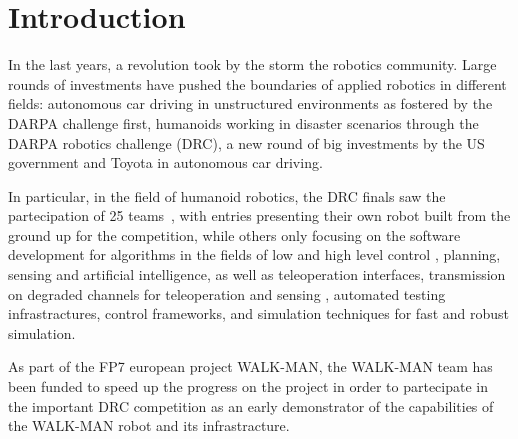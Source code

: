 \documentclass[%
	paper=A4,					%
	twoside=true,				%
	openright,			.
	parskip=full,				%
	chapterprefix=true,			%
	11pt,						%
	headings=normal,			%
	bibliography=totoc,			%
	listof=totoc,				%
	titlepage=on,				%
	captions=tableabove,		%
	draft=false,				%
]{scrreprt}%
\begin{document}

\pagestyle{empty}				%
\cleardoublepage

\pagestyle{plain}				%
\cleardoublepage
%
\setcounter{tocdepth}{2}		%
\tableofcontents				%
\cleardoublepage

\setcounter{page}{1}			%
\pagestyle{maincontentstyle} 	%

\chapter{Introduction}
In the last years, a revolution took by the storm the robotics community. Large rounds of investments have pushed the boundaries of applied robotics in different fields: autonomous car driving in unstructured environments as fostered by the DARPA challenge first, humanoids working in disaster scenarios through the DARPA robotics challenge (DRC), a new round of big investments by the US government and Toyota in autonomous car driving.

In particular, in the field of humanoid robotics,  the DRC finals saw the partecipation of 25 teams~\cite{DRC-what-happened}, with entries presenting their own robot built from the ground up for the competition, while others only focusing on the software development for algorithms in the fields of low and high level control \cite{beeson15, feng2015-rj, feng2015-oj}, planning, sensing and artificial intelligence, as well as teleoperation interfaces, transmission on degraded channels for teleoperation and sensing \cite{fallon2015-ni}, automated testing infrastractures, control frameworks, and simulation techniques for fast and robust simulation.

As part of the FP7 european project WALK-MAN, the WALK-MAN team has been funded to speed up the progress on the project in order to partecipate in the important DRC competition as an early demonstrator of the capabilities of the WALK-MAN robot and its infrastracture.
\end{document}
